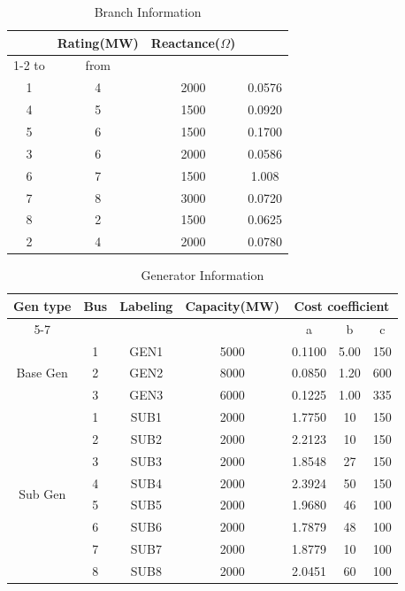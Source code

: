 \documentclass[journal]{IEEEtran} %
\begin{document}
\begin{table}[h!]
\centering
\caption{Branch Information}
\label{table_4}
\begin{tabular}{cc | c | c}
\noalign{\smallskip}\noalign{\smallskip}\hline\hline
\multicolumn{2}{c|}{Bus} & \multirow{2}{*}{Rating(MW)} & \multirow{2}{*}{Reactance($\Omega$)}\\
\cline{1-2}
to & from &  &  \\
\hline
1 & 4 & 2000 & 0.0576\\
\hline
4 & 5 & 1500 & 0.0920\\
\hline
5 & 6 & 1500 & 0.1700\\
\hline
3 & 6 & 2000 & 0.0586\\
\hline
6 & 7 & 1500 & 1.008\\
\hline
7 & 8 & 3000 & 0.0720\\
\hline
8 & 2 & 1500 & 0.0625\\
\hline
2 & 4 & 2000 & 0.0780\\
\hline\hline
\end{tabular}
\end{table}

\begin{table}[h!]
\caption{Generator Information}
\label{Table_5}
\centering
\begin{tabular}{c | c c c | c c c}
\hline\hline
\multirow{2}{*}{Gen type} & \multirow{2}{*}{Bus} & \multirow{2}{*}{Labeling} & \multirow{2}{*}{Capacity(MW)} & \multicolumn{3}{|c}{Cost coefficient} \\
\cline{5-7}
&  &  &  & a & b  & c  \\
\hline
\multirow{3}{*}{Base Gen} & 1 &GEN1 & 5000 & 0.1100 & 5.00 & 150\\
\cline{2-7}
& 2 & GEN2 & 8000 & 0.0850 & 1.20 & 600\\
\cline{2-7}
& 3 & GEN3 & 6000 & 0.1225 & 1.00 & 335\\
\hline
\multirow{8}{*}{Sub Gen} & 1 & SUB1 & 2000 & 1.7750 & 10 & 150\\
\cline{2-7}
& 2 & SUB2 & 2000 & 2.2123 & 10 & 150\\
\cline{2-7}
& 3 & SUB3 & 2000 & 1.8548 & 27 & 150\\
\cline{2-7}
& 4 & SUB4 & 2000 & 2.3924 & 50 & 150\\
\cline{2-7}
& 5 & SUB5 & 2000 & 1.9680 & 46 & 100\\
\cline{2-7}
& 6 & SUB6 & 2000 & 1.7879 & 48 & 100\\
\cline{2-7}
& 7 & SUB7 & 2000 & 1.8779 & 10 & 100\\
\cline{2-7}
& 8 & SUB8 & 2000 & 2.0451 & 60 & 100\\
\hline\hline
\end{tabular}
\end{table}
\end{document}
